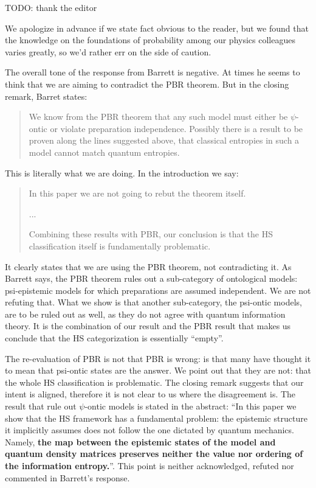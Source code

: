 \documentclass[11pt]{article}
\begin{document}
	
	TODO: thank the editor
	
	We apologize in advance if we state fact obvious to the reader, but we found that the knowledge on the foundations of probability among our physics colleagues varies greatly, so we'd rather err on the side of caution.
	
	The overall tone of the response from Barrett is negative. At times he seems to think that we are aiming to contradict the PBR theorem. But in the closing remark, Barret states:
	\begin{quote}
		We know from the PBR theorem that
		any such model must either be $\psi$-ontic or violate preparation independence.
		Possibly there is a result to be proven along the lines suggested above, that
		classical entropies in such a model cannot match quantum entropies.
	\end{quote}
	This is literally what we are doing. In the introduction we say:
	\begin{quote}
		In this paper we are not going to rebut the theorem
		itself.
		
		...
		
		Combining these results with PBR, our conclusion is that
		the HS classification itself is fundamentally problematic.
	\end{quote}
	It clearly states that we are using the PBR theorem, not contradicting it. As Barrett says, the PBR theorem rules out a sub-category of ontological models: psi-epistemic models for which preparations are assumed independent. We are not refuting that. What we show is that another sub-category, the psi-ontic models, are to be ruled out as well, as they do not agree with quantum information theory. It is the combination of our result and the PBR result that makes us conclude that the HS categorization is essentially ``empty''.
	
	The re-evaluation of PBR is not that PBR is wrong: is that many have thought it to mean that psi-ontic states are the answer. We point out that they are not: that the whole HS classification is problematic. The closing remark suggests that our intent is aligned, therefore it is not clear to us where the disagreement is. The result that rule out $\psi$-ontic models is stated in the abstract: ``In this paper we show that the HS framework has a fundamental problem: the epistemic structure it implicitly assumes does not follow the one dictated by quantum mechanics. Namely, \textbf{the map between the epistemic states of the model and quantum density matrices preserves neither the value nor ordering of the information entropy.}''. This point is neither acknowledged, refuted nor commented in Barrett's response.
	
\end{document}
